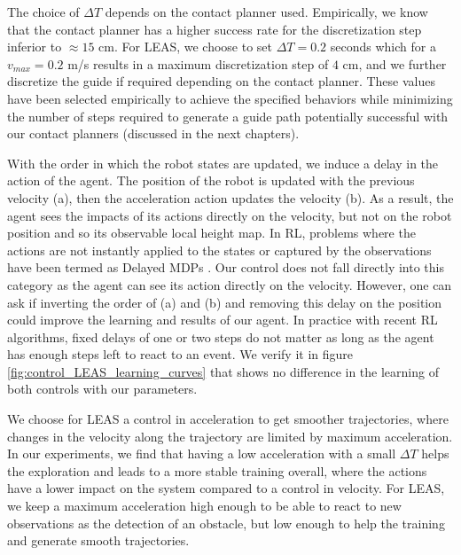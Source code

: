 The choice of $\Delta T$ depends on the contact planner used. 
Empirically, we know that the contact planner \cite{AcyclicCP} has a higher success rate for the discretization step inferior to $\approx 15$ cm.
For LEAS, we choose to set $\Delta T=0.2$ seconds which for a $v_{max}=0.2$ m/s results in a maximum discretization step of $4$ cm, and we further discretize the guide if required depending on the contact planner.
These values have been selected empirically to achieve the specified behaviors while minimizing the number of steps required to generate a guide path potentially successful with our contact planners (discussed in the next chapters).

With the order in which the robot states are updated, we induce a delay in the action of the agent. 
The position of the robot is updated with the previous velocity (a), then the acceleration action updates the velocity (b). As a result, the agent sees the impacts of its actions directly on the velocity, but not on the robot position and so its observable local height map.
In RL, problems where the actions are not instantly applied to the states or captured by the observations have been termed as Delayed MDPs \cite{RL_delayed}. 
Our control does not fall directly into this category as the agent can see its action directly on the velocity. However, one can ask if inverting the order of (a) and (b) and removing this delay on the position could improve the learning and results of our agent. 
In practice with recent RL algorithms, fixed delays of one or two steps do not matter \cite{RL_delayed_explanation} as long as the agent has enough steps left to react to an event. We verify it in figure \ref{fig:control_LEAS_learning_curves} that shows no difference in the learning of both controls with our parameters.

We choose for LEAS a control in acceleration to get smoother trajectories, where changes in the velocity along the trajectory are limited by maximum acceleration.
In our experiments, we find that having a low acceleration with a small $\Delta T$ helps the exploration and leads to a more stable training overall, where the actions have a lower impact on the system compared to a control in velocity.
For LEAS, we keep a maximum acceleration high enough to be able to react to new observations as the detection of an obstacle, but low enough to help the training and generate smooth trajectories.


